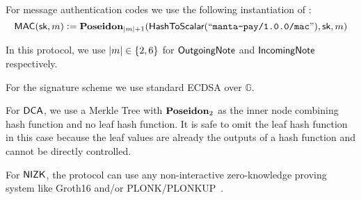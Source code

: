 \begin{definition}
    For message authentication codes we use the following instantiation of \Poseidon{}:
    \[{\textsf{MAC}}({\textsf{sk}}, m) := {\textbf{Poseidon}}_{\left|m\right| + 1}({\textsf{HashToScalar}}({``\texttt{manta-pay/1.0.0/mac}"}), {\textsf{sk}}, m)\]

    In this protocol, we use $|m| \in \set{2, 6}$ for ${\textsf{OutgoingNote}}$ and ${\textsf{IncomingNote}}$ respectively.
\end{definition}

\begin{definition}
    For the signature scheme we use standard ECDSA over $\mathbb{G}$.
\end{definition}

\begin{definition}
    For ${\textsf{DCA}}$, we use a Merkle Tree with ${\textbf{Poseidon}}_2$ as the inner node combining hash function and no leaf hash function. It is safe to omit the leaf hash function in this case because the leaf values are already the outputs of a hash function and cannot be directly controlled.
\end{definition}

\begin{definition} \label{def:concrete-zkp}
    For ${\textsf{NIZK}}$, the protocol can use any non-interactive zero-knowledge proving system like Groth16 \cite{KRRS21USENIX} and/or PLONK/PLONKUP~\cite{plonk,plonkup}. 
\end{definition}

